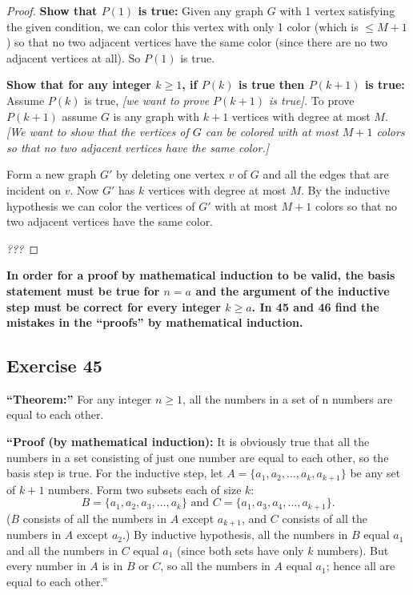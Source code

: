 \documentclass[14pt]{extarticle}
\newcommand{\cy}{\color{cyan}}
\begin{document}
\begin{proof}
{\bf Show that $P(1)$ is true:} Given any graph $G$ with 1 vertex satisfying the given condition, we can color this vertex with only 1 color (which is $\leq M+1$) so that no two adjacent vertices have the same color (since there are no two adjacent vertices at all). So $P(1)$ is true.

{\bf Show that for any integer $k \geq 1$, if $P(k)$ is true then $P(k+1)$ is true:} Assume $P(k)$ is true, {\it [we want to prove $P(k+1)$ is true].} To prove $P(k+1)$ assume $G$ is any graph with $k+1$ vertices with degree at most $M$. {\it [We want to show that the vertices of $G$ can be colored with at most $M+1$ colors so that no two adjacent vertices have the same color.]}


Form a new graph $G'$ by deleting one vertex $v$ of $G$ and all the edges that are incident on $v$. Now $G'$ has $k$ vertices with degree at most $M$. By the inductive hypothesis we can color the vertices of $G'$ with at most $M+1$ colors so that no two adjacent vertices have the same color.

{\it ???}
\end{proof}

{\bf \cy In order for a proof by mathematical induction to be valid, the basis statement must be true for $n = a$ and the argument of the inductive step must be correct for every integer $k \geq a$. In 45 and 46 find the mistakes in the “proofs” by mathematical induction.}

\subsection{Exercise 45}
{\bf “Theorem:”} For any integer $n \geq 1$, all the numbers in a set of n numbers are equal to each other.

{\bf “Proof (by mathematical induction):} It is obviously true that all the numbers in a set consisting of just one number are equal to each other, so the basis step is true. For the inductive step, let $A = \{a_1, a_2, \ldots, a_k, a_{k+1}\}$ be any set of $k + 1$ numbers. Form two subsets each of size $k$:
\[
B = \{a_1, a_2, a_3, \ldots, a_k\} \text{ and } C = \{a_1, a_3, a_4, \ldots, a_{k+1}\}.
\]
($B$ consists of all the numbers in $A$ except $a_{k+1}$, and $C$ consists of all the numbers in $A$ except $a_2$.) By inductive hypothesis, all the numbers in $B$ equal $a_1$ and all the numbers in $C$ equal $a_1$ (since both sets have only $k$ numbers). But every number in $A$ is in $B$ or $C$, so all the numbers in $A$ equal $a_1$; hence all are equal to each other.”
\end{document}
